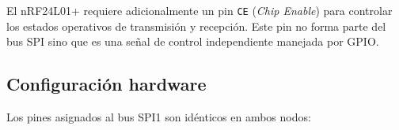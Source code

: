 \documentclass[12pt,a4paper]{article}
\begin{document}
  El nRF24L01+ requiere adicionalmente un pin \texttt{CE} (\textit{Chip Enable}) para controlar los estados operativos de transmisión y recepción. Este pin no forma parte del bus SPI sino que es una señal de control independiente manejada por GPIO.      
                                                                                                                                                                                                                                                              
  \subsection{Configuración hardware}                                                                                                                                                                                                                         
                                                                                                                                                                                                                                                              
  Los pines asignados al bus SPI1 son idénticos en ambos nodos:                                                                                                                                                                                               
                                                                                                                                                                                                                                                              
\end{document}
